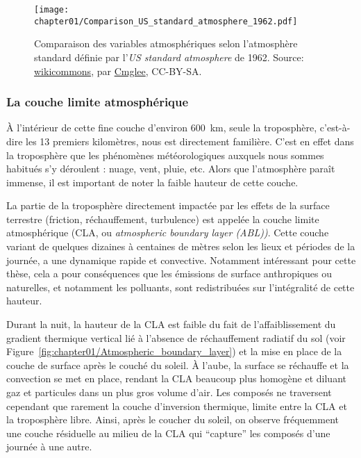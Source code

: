 \begin{figure}[ht]
    \centering
    \texttt{[image: chapter01/Comparison\_US\_standard\_atmosphere\_1962.pdf]}
    \caption{%
        Comparaison des variables atmosphériques selon l'atmosphère standard définie par
        l'\textit{US standard atmosphere} de 1962.
        Source:
        \href{https://commons.wikimedia.org/wiki/File:Comparison_US_standard_atmosphere_1962.svg}{wikicommons},
        par \href{https://commons.wikimedia.org/wiki/User:Cmglee}{Cmglee}, CC-BY-SA.
    }%
    \label{fig:chapter01/Comparison_US_standard_atmosphere_1962}
\end{figure}

\subsubsection{La couche limite atmosphérique}%
\label{sub:la_couche_limite_atmospherique}

À l'intérieur de cette fine couche d'environ \SI{600}{km}, seule la troposphère,
c'est-à-dire les 13 premiers kilomètres, nous est directement familière. C'est en effet
dans la troposphère que les phénomènes météorologiques auxquels nous sommes habitués s'y
déroulent : nuage, vent, pluie, etc. Alors que l'atmosphère paraît immense, il est
important de noter la faible hauteur de cette couche.

La partie de la troposphère directement impactée par les effets de la surface terrestre
(friction, réchauffement, turbulence) est appelée la couche limite atmosphérique (CLA, ou
\textit{atmospheric boundary layer (ABL))}. Cette couche variant de quelques dizaines à centaines
de mètres selon les lieux et périodes de la journée, a une dynamique rapide et
convective. Notamment intéressant pour cette thèse, cela a pour conséquences que les
émissions de surface anthropiques ou naturelles, et notamment les polluants, sont
redistribuées sur l'intégralité de cette hauteur.

Durant la nuit, la hauteur de la CLA est faible du fait de l'affaiblissement du
gradient thermique vertical lié à l'absence de réchauffement radiatif du sol (voir
Figure~\ref{fig:chapter01/Atmospheric_boundary_layer}) et la mise en place de la couche de
surface après le couché du soleil. À l'aube, la surface se réchauffe et la
convection se met en place, rendant la CLA beaucoup plus homogène et diluant gaz et
particules dans un plus gros volume d'air. Les composés ne traversent cependant que
rarement la couche d'inversion thermique, limite entre la CLA et la troposphère libre.
Ainsi, après le coucher du soleil, on observe fréquemment une couche résiduelle au milieu de
la CLA qui ``capture'' les composés d'une journée à une autre.

